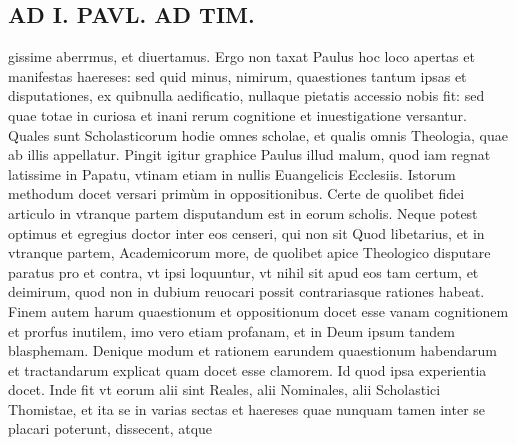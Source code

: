 \documentclass{article}
\begin{document}
\begin{pages}
\section*{AD I. PAVL. AD TIM. }
\marginpar{[ p.P ]}\pstart gissime aberrmus, et diuertamus.  \pend\pstart Ergo non taxat Paulus hoc loco apertas et manifestas haereses: sed quid minus, nimirum, quaestiones tantum ipsas et disputationes, ex quibnulla aedificatio, nullaque pietatis accessio nobis fit: sed quae totae in curiosa et inani rerum cognitione et inuestigatione versantur. Quales sunt Scholasticorum hodie omnes scholae, et qualis omnis Theologia, quae ab illis appellatur. Pingit igitur graphice Paulus illud malum, quod iam regnat latissime in Papatu, vtinam etiam in nullis Euangelicis Ecclesiis. Istorum methodum docet versari primùm in oppositionibus. Certe de quolibet fidei articulo in vtranque partem disputandum est in eorum scholis. Neque potest optimus et egregius doctor inter eos censeri, qui non sit Quod libetarius, et in vtranque partem, Academicorum more, de quolibet apice Theologico disputare paratus pro et contra, vt ipsi loquuntur, vt nihil sit apud eos tam certum, et deimirum, quod non in dubium reuocari possit contrariasque rationes habeat.  \pend\pstart Finem autem harum quaestionum et oppositionum docet esse vanam cognitionem et prorfus inutilem, imo vero etiam profanam, et in Deum ipsum tandem blasphemam.  \pend\pstart Denique modum et rationem earundem quaestionum habendarum et tractandarum explicat quam docet esse clamorem. Id quod ipsa experientia docet. Inde fit vt eorum alii sint Reales, alii Nominales, alii Scholastici Thomistae, et ita se in varias sectas et haereses quae nunquam tamen inter se placari poterunt, dissecent, atque  \pend

\end{pages}
\end{document}
